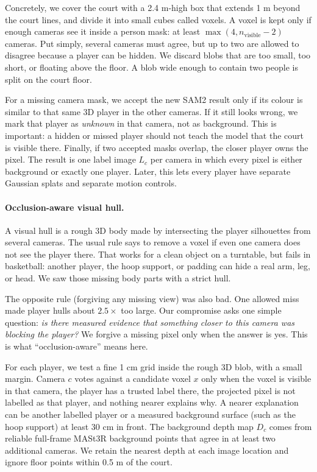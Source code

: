 \documentclass[11pt]{article}
\begin{document}
Concretely, we cover the court with a 2.4 m-high box that extends 1 m beyond the court lines, and
divide it into small cubes called voxels. A voxel is kept only if enough cameras see it inside a
person mask: at least $\max(4,n_{\mathrm{visible}}-2)$ cameras. Put simply, several cameras must
agree, but up to two are allowed to disagree because a player can be hidden. We discard blobs that
are too small, too short, or floating above the floor. A blob wide enough to contain two people is
split on the court floor.

For a missing camera mask, we accept the new SAM2 result only if its colour is similar to that same
3D player in the other cameras. If it still looks wrong, we mark that player as \emph{unknown} in
that camera, not as background. This is important: a hidden or missed player should not teach the
model that the court is visible there. Finally, if two accepted masks overlap, the closer player
owns the pixel. The result is one label image $L_c$ per camera in which every pixel is either
background or exactly one player. Later, this lets every player have separate Gaussian splats and
separate motion controls.

\paragraph{Occlusion-aware visual hull.}
A visual hull is a rough 3D body made by intersecting the player silhouettes from several cameras.
The usual rule says to remove a voxel if even one camera does not see the player there. That works
for a clean object on a turntable, but fails in basketball: another player, the hoop support, or
padding can hide a real arm, leg, or head. We saw those missing body parts with a strict hull.

The opposite rule (forgiving any missing view) was also bad. One allowed miss made player hulls
about $2.5\times$ too large. Our compromise asks one simple question: \emph{is there measured
evidence that something closer to this camera was blocking the player?} We forgive a missing pixel
only when the answer is yes. This is what ``occlusion-aware'' means here.

For each player, we test a fine 1 cm grid inside the rough 3D blob, with a small margin. Camera
$c$ votes against a candidate voxel $x$ only when the voxel is visible in that camera, the player
has a trusted label there, the projected pixel is not labelled as that player, and nothing nearer
explains why. A nearer explanation can be another labelled player or a measured background surface
(such as the hoop support) at least 30 cm in front. The background depth map $D_c$ comes from
reliable full-frame MASt3R background points that agree in at least two additional cameras. We
retain the nearest depth at each image location and ignore floor points within 0.5 m of the court.
\end{document}
